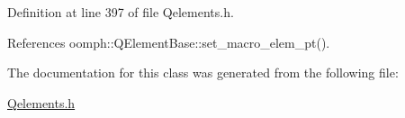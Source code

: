 Definition at line 397 of file Qelements.\+h.



References oomph\+::\+Q\+Element\+Base\+::set\+\_\+macro\+\_\+elem\+\_\+pt().



The documentation for this class was generated from the following file\+:\begin{DoxyCompactItemize}
\item 
\hyperlink{Qelements_8h}{Qelements.\+h}\end{DoxyCompactItemize}
